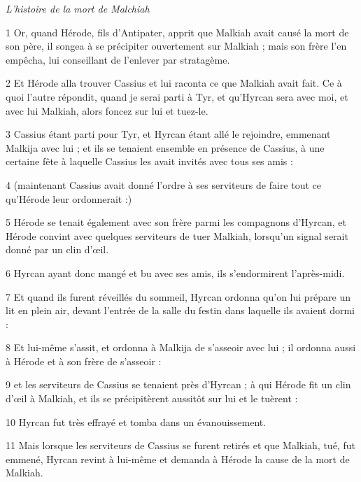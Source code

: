 \par \textit{L'histoire de la mort de Malchiah}

\par 1 Or, quand Hérode, fils d'Antipater, apprit que Malkiah avait causé la mort de son père, il songea à se précipiter ouvertement sur Malkiah ; mais son frère l'en empêcha, lui conseillant de l'enlever par stratagème.

\par 2 Et Hérode alla trouver Cassius et lui raconta ce que Malkiah avait fait. Ce à quoi l'autre répondit, quand je serai parti à Tyr, et qu'Hyrcan sera avec moi, et avec lui Malkiah, alors foncez sur lui et tuez-le.

\par 3 Cassius étant parti pour Tyr, et Hyrcan étant allé le rejoindre, emmenant Malkija avec lui ; et ils se tenaient ensemble en présence de Cassius, à une certaine fête à laquelle Cassius les avait invités avec tous ses amis :

\par 4 (maintenant Cassius avait donné l'ordre à ses serviteurs de faire tout ce qu'Hérode leur ordonnerait :)

\par 5 Hérode se tenait également avec son frère parmi les compagnons d'Hyrcan, et Hérode convint avec quelques serviteurs de tuer Malkiah, lorsqu'un signal serait donné par un clin d'œil.

\par 6 Hyrcan ayant donc mangé et bu avec ses amis, ils s'endormirent l'après-midi.

\par 7 Et quand ils furent réveillés du sommeil, Hyrcan ordonna qu'on lui prépare un lit en plein air, devant l'entrée de la salle du festin dans laquelle ils avaient dormi :

\par 8 Et lui-même s'assit, et ordonna à Malkija de s'asseoir avec lui ; il ordonna aussi à Hérode et à son frère de s'asseoir :

\par 9 et les serviteurs de Cassius se tenaient près d'Hyrcan ; à qui Hérode fit un clin d'œil à Malkiah, et ils se précipitèrent aussitôt sur lui et le tuèrent :

\par 10 Hyrcan fut très effrayé et tomba dans un évanouissement.

\par 11 Mais lorsque les serviteurs de Cassius se furent retirés et que Malkiah, tué, fut emmené, Hyrcan revint à lui-même et demanda à Hérode la cause de la mort de Malkiah.

